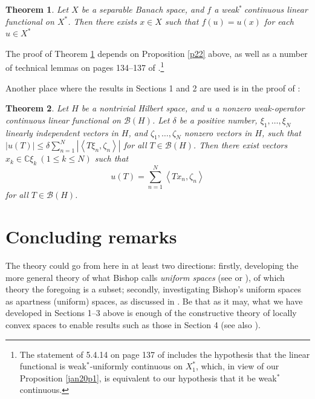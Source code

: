 \documentclass{article}%
\newtheorem{theorem}{Theorem}
\begin{document}
\begin{theorem}
\label{jan30t2}Let $X$ be a separable Banach space, and $f$ a weak$^{\ast}%
~$continuous linear functional on $X^{\ast}$. Then there exists $x\in X$ such
that $f(u)=u(x)$ for each $u\in X^{\ast}$ \emph{\cite[5.4.14]{BVtech}}
\end{theorem}

The proof of Theorem \ref{jan30t2} depends on Proposition \ref{p22} above, as
well as a number of technical lemmas on pages 134--137 of \cite{BVtech}%
.\footnote{%
\normalfont\sf
The statement of 5.4.14 on page 137 of \cite{BVtech} includes the hypothesis
that the linear functional is weak$^{\ast}$-uniformly continuous on
$X_{1}^{\ast}$, which, in view of our Proposition \ref{jan20p1}, is equivalent
to our hypothesis that it be weak$^{\ast}$ continuous.}

Another place where the results in Sections 1 and 2 are used is in the proof
of \cite[Theorem 10]{dsbfnl}:

\begin{theorem}
\label{jan30t3}Let $H$ be a nontrivial Hilbert space, and $u$ a nonzero
weak-operator continuous linear functional on $\mathcal{B}(H)$. Let $\delta$
be a positive number, $\xi_{1},\ldots,\xi_{N}$ linearly independent vectors in
$H$, and $\zeta_{1},\ldots,\zeta_{N}$ nonzero vectors in $H$, such that
$\left\vert u(T)\right\vert \leq\delta\sum_{n=1}^{N}\left\vert \left\langle
T\xi_{n},\zeta_{n}\right\rangle \right\vert $ for all $T\in\mathcal{B}(H)$.
Then there exist vectors $x_{k}\in\mathbb{C}\xi_{k}\ (1\leq k\leq N)$ such
that%
\[
u(T)=\sum_{n=1}^{N}\left\langle Tx_{n},\zeta_{n}\right\rangle
\]
for all $T\in\mathcal{B}(H)$.
\end{theorem}

\section{Concluding remarks}

The theory could go from here in at least two directions: firstly, developing
the more general theory of what Bishop calls \emph{uniform spaces }(see
\cite[pages 110-111]{Bishop} or \cite[page 124]{BB}), of which theory the
foregoing is a subset; secondly, investigating Bishop's uniform spaces as
apartness (uniform) spaces, as discussed in \cite{BVtech}. Be that as it may,
what we have developed in Sections 1--3 above is enough of the constructive
theory of locally convex spaces to enable results such as those in Section 4
(see also \cite{BridgesVNA}).%
\end{document}
